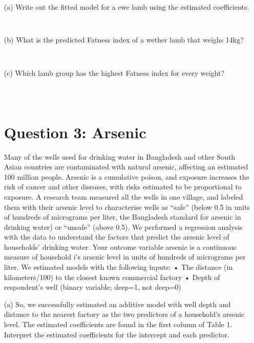 \documentclass[12pt,letterpaper]{article}
\begin{document}
{	\vspace{.25cm}
	\noindent 
	
	
	\vspace{.5cm}
	
	
	\vspace{.5cm}
	\begin{enumerate}
		\item [(a)] Write out the fitted model for a ewe lamb using the estimated coefficients.
		
		
		
		\begin{verbatim}
		
		\end{verbatim}
		
		\newpage		
		\item [(b)] What is the predicted Fatness index of a wether lamb that weighs 14kg?
		
		\begin{verbatim}
		
		\end{verbatim}
		
		
		\item [(c)] Which lamb group has the highest Fatness index for every weight?
		
	
		\begin{verbatim}
			
			
		\end{verbatim}
		\vspace{.5cm}
	\section*{Question 3: Arsenic}
	Many of the wells used for drinking water in Bangladesh and other South Asian countries are
	contaminated with natural arsenic, affecting an estimated 100 million people. Arsenic is a
	cumulative poison, and exposure increases the risk of cancer and other diseases, with risks
	estimated to be proportional to exposure.
	A research team measured all the wells in one village, and labeled them with their arsenic
	level to characterise wells as “safe” (below 0.5 in units of hundreds of micrograms per liter,
	the Bangladesh standard for arsenic in drinking water) or “unsafe” (above 0.5).
	We performed a regression analysis with the data to understand the factors that predict the
	arsenic level of households’ drinking water. Your outcome variable arsenic is a continuous
	measure of household i’s arsenic level in units of hundreds of micrograms per liter.
	We estimated models with the following inputs:
	• The distance (in kilometers/100) to the closest known commercial factory
	• Depth of respondent’s well (binary variable; deep=1, not deep=0)
		\item [(a)] 
		So, we successfully estimated an additive model with well depth and distance to the
		nearest factory as the two predictors of a household’s arsenic level. The estimated
		coefficients are found in the first column of Table 1. Interpret the estimated coefficients
		for the intercept and each predictor.
		\begin{verbatim}
		

\end{verbatim}
\end{enumerate}}
\end{document}
